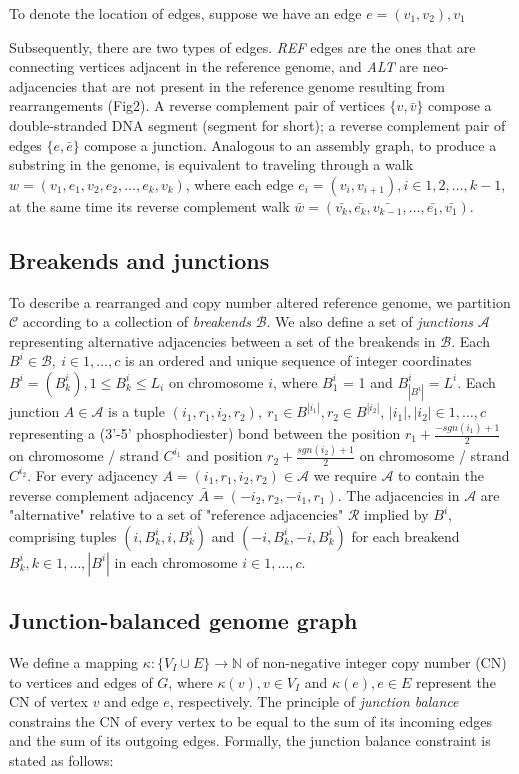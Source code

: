 \documentclass[phd,tocprelim]{cornell}
\begin{document}
To denote the location of edges, suppose we have an edge $e = (v_1, v_2), v_1$

Subsequently, there are two types of edges. \textit{REF} edges are the ones that are connecting vertices adjacent in the reference genome, and \textit{ALT} are neo-adjacencies that are not present in the reference genome resulting from rearrangements (Fig2). A reverse complement pair of vertices $\{v, \bar{v}\}$ compose a double-stranded DNA segment (segment for short); a reverse complement pair of edges $\{e, \bar{e}\}$ compose a junction. Analogous to an assembly graph, to produce a substring in the genome, is equivalent to traveling through a walk $w = (v_1, e_1, v_2, e_2, \dots, e_k, v_k)$, where each edge $e_i = (v_i, v_{i+1}), i \in 1, 2, \dots, k-1$, at the same time its reverse complement walk $\bar{w} = (\bar{v_k}, \bar{e_k}, \bar{v_{k-1}}, \dots, \bar{e_1}, \bar{v_1})$.


\subsection{Breakends and junctions}
To describe a rearranged and copy number altered reference genome, we partition $\mathcal{C}$ according to a collection of \textit{breakends} $\mathcal{B}$. We also define a set of \textit{junctions} $\mathcal{A}$ representing alternative adjacencies between a set of the  breakends in $\mathcal{B}$. Each $B^i \in \mathcal{B},\ i \in 1,\ldots,c$ is an ordered and unique sequence of integer coordinates $B^i = (B^i_k), 1 \le B^i_k \le L_i$ on chromosome $i$, where $B^i_1$ = 1 and $B^i_{|B^i|} = L^i$.  Each junction $A \in \mathcal{A}$ is a tuple $(i_1,r_1,i_2,r_2),\ r_1 \in B^{|i_1|}, r_2 \in B^{|i_2|}$, $|i_1|, |i_2| \in  1, \ldots, c$ representing a (3'-5' phosphodiester) bond between the position $r_1 + \frac{-sgn(i_1)+1}{2}$ on chromosome / strand $C^{i_1}$ and position $r_2+\frac{sgn(i_2)+1}{2}$ on chromosome / strand $C^{i_2}$.  For every adjacency $A = (i_1,r_1,i_2,r_2) \in \mathcal{A}$ we require $\mathcal{A}$ to contain the reverse complement adjacency $\bar{A} = (-i_2,r_2, -i_1,r_1)$. The adjacencies in $\mathcal{A}$ are "alternative" relative to a set of "reference adjacencies" $\mathcal{R}$ implied by $B^i$, comprising tuples $(i, B^i_k, i, B^i_k)$ and $(-i, B^i_k, -i, B^i_k)$ for each breakend $B^i_k, k\in 1,\dots,|B^i|$ in each chromosome $i \in 1,\ldots,c$.

\subsection{Junction-balanced genome graph}
We define a mapping $\kappa:\{V_I \cup E\}\rightarrow \mathbb{N}$ of non-negative integer copy number (CN) to vertices and edges of $G$, where $\kappa(v),v \in V_I$ and  $\kappa(e),e \in E$ represent the CN of vertex $v$ and edge $e$, respectively.  The principle of \textit{junction balance} constrains the CN of every vertex to be equal to the sum of its incoming edges and the sum of its outgoing edges.  Formally, the junction balance constraint is stated as follows:
\end{document}
